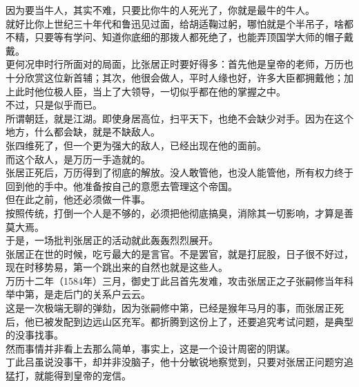 \begin{multicols}{\theparacolNo}
因为要当牛人，其实不难，只要比你牛的人死光了，你就是最牛的牛人。\\

就好比你上世纪三十年代和鲁迅见过面，给胡适鞠过躬，哪怕就是个半吊子，啥都不精，只要等有学问、知道你底细的那拨人都死绝了，也能弄顶国学大师的帽子戴戴。\\

更何况申时行所面对的局面，比张居正时要好得多：首先他是皇帝的老师，万历也十分欣赏这位新首辅；其次，他很会做人，平时人缘也好，许多大臣都拥戴他；加上此时他位极人臣，当上了大领导，一切似乎都在他的掌握之中。\\

不过，只是似乎而已。\\

所谓朝廷，就是江湖。即使身居高位，扫平天下，也绝不会缺少对手。因为在这个地方，什么都会缺，就是不缺敌人。\\

张四维死了，但一个更为强大的敌人，已经出现在他的面前。\\

而这个敌人，是万历一手造就的。\\

张居正死后，万历得到了彻底的解放。没人敢管他，也没人能管他，所有权力终于回到他的手中。他准备按自己的意愿去管理这个帝国。\\

但在此之前，他还必须做一件事。\\

按照传统，打倒一个人是不够的，必须把他彻底搞臭，消除其一切影响，才算是善莫大焉。\\

于是，一场批判张居正的活动就此轰轰烈烈展开。\\

张居正在世的时候，吃亏最大的是言官。不是罢官，就是打屁股，日子很不好过，现在时移势易，第一个跳出来的自然也就是这些人。\\

万历十二年（1584年）三月，御史丁此吕首先发难，攻击张居正之子张嗣修当年科举中第，是走后门的关系户云云。\\

这是一次极端无聊的弹劾，因为张嗣修中第，已经是猴年马月的事，而张居正死后，他已被发配到边远山区充军。都折腾到这份上了，还要追究考试问题，是典型的没事找事。\\

然而事情并非看上去那么简单，事实上，这是一个设计周密的阴谋。\\

丁此吕虽说没事干，却并非没脑子，他十分敏锐地察觉到，只要对张居正问题穷追猛打，就能得到皇帝的宠信。\\


\end{multicols}
